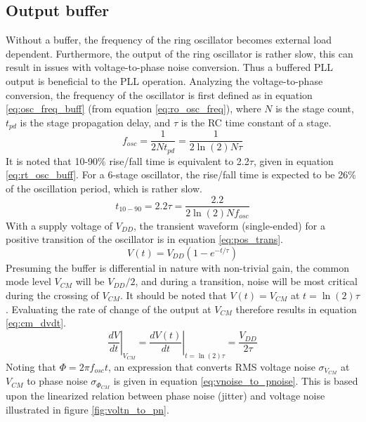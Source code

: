 	\FloatBarrier\pagebreak
	\subsection{Output buffer}
		Without a buffer, the frequency of the ring oscillator becomes external load dependent. Furthermore, the output of the ring oscillator is rather slow, this can result in issues with voltage-to-phase noise conversion. Thus a buffered PLL output is beneficial to the PLL operation. Analyzing the voltage-to-phase conversion, the frequency of the oscillator is first defined as in equation \ref{eq:osc_freq_buff} (from equation \ref{eq:ro_osc_freq}), where $N$ is the stage count, $t_{pd}$ is the stage propagation delay, and $\tau$ is the RC time constant of a stage. 
		\begin{equation}\label{eq:osc_freq_buff}
			f_{osc} = \frac{1}{2N t_{pd}} = \frac{1}{2\ln(2)N \tau}
		\end{equation}
		It is noted that 10-90\% rise/fall time is equivalent to 2.2$\tau$, given in equation \ref{eq:rt_osc_buff}. For a 6-stage oscillator, the rise/fall time is expected to be 26\% of the oscillation period, which is rather slow.
		\begin{equation}\label{eq:rt_osc_buff}
			t_{10-90} = 2.2\tau =  \frac{2.2}{2\ln(2)N f_{osc}}
		\end{equation}		
		With a supply voltage of $V_{DD}$, the transient waveform (single-ended) for a positive transition of the oscillator is in equation \ref{eq:pos_trans}.
		\begin{equation}\label{eq:pos_trans}
			V(t) =V_{DD}\left( 1 - e^{-t/\tau} \right)
		\end{equation}		
		Presuming the buffer is differential in nature with non-trivial gain, the common mode level $V_{CM}$ will be $V_{DD}/2$, and during a transition, noise will be most critical during the crossing of $V_{CM}$. It should be noted that $V(t) = V_{CM}$ at $t = \ln(2)\tau$. Evaluating the rate of change of the output at $V_{CM}$ therefore results in equation \ref{eq:cm_dvdt}.
		\begin{equation}\label{eq:cm_dvdt}
			\left.\frac{dV}{dt}\right|_{V_{CM}} = \left.\frac{dV(t)}{dt}\right|_{t= \ln(2)\tau} = \frac{V_{DD}}{2\tau}
		\end{equation}	
		Noting that $\Phi = 2\pi f_{osc}t$, an expression that converts RMS voltage noise $\sigma_{V_{CM}}$ at $V_{CM}$ to phase noise $\sigma_{\Phi_{CM}}$ is given in equation \ref{eq:vnoise_to_pnoise}. This is based upon the linearized relation between phase noise (jitter) and voltage noise illustrated in figure \ref{fig:voltn_to_pn}.
